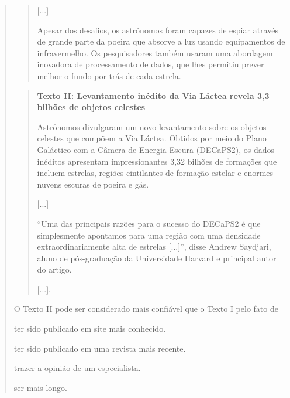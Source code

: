 \begin{quote}
\begin{quote}
{[}...{]}

Apesar dos desafios, os astrônomos foram capazes de espiar através de
grande parte da poeira que absorve a luz usando equipamentos de
infravermelho. Os pesquisadores também usaram uma abordagem inovadora de
processamento de dados, que lhes permitiu prever melhor o fundo por trás
de cada estrela.

\end{quote}

\begin{quote}
\textbf{Texto II: Levantamento inédito da Via Láctea revela 3,3 bilhões
de objetos celestes}

Astrônomos divulgaram um novo levantamento sobre os objetos celestes
que compõem a Via Láctea. Obtidos por meio do Plano Galáctico com a
Câmera de Energia Escura (DECaPS2), os dados inéditos apresentam
impressionantes 3,32 bilhões de formações que incluem estrelas, regiões
cintilantes de formação estelar e enormes nuvens escuras de poeira e
gás.

{[}...{]}

``Uma das principais razões para o sucesso do DECaPS2 é que simplesmente
apontamos para uma região com uma densidade extraordinariamente alta de
estrelas {[}...{]}'', disse Andrew Saydjari, aluno de pós-graduação da
Universidade Harvard e principal autor do artigo.

{[}...{]}.

\end{quote}

O Texto II pode ser considerado mais confiável que o Texto I pelo fato de

\begin{escolha}
\item ter sido publicado em site mais conhecido.

\item ter sido publicado em uma revista mais recente.

\item trazer a opinião de um especialista.

\item ser mais longo.
\end{escolha}

\end{quote}
